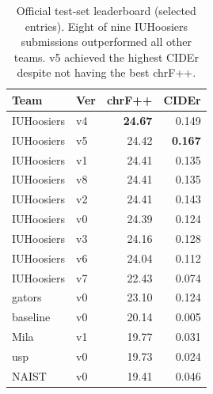 \documentclass[11pt]{article}
\begin{document}
\begin{table}[t]
\centering
\small
\setlength{\tabcolsep}{4pt}
\begin{tabular}{llrr}
\toprule
\textbf{Team} & \textbf{Ver} & \textbf{chrF++} & \textbf{CIDEr} \\
\midrule
IUHoosiers & v4 & \textbf{24.67} & 0.149 \\
IUHoosiers & v5 & 24.42 & \textbf{0.167} \\
IUHoosiers & v1 & 24.41 & 0.135 \\
IUHoosiers & v8 & 24.41 & 0.135 \\
IUHoosiers & v2 & 24.41 & 0.143 \\
IUHoosiers & v0 & 24.39 & 0.124 \\
IUHoosiers & v3 & 24.16 & 0.128 \\
IUHoosiers & v6 & 24.04 & 0.112 \\
IUHoosiers & v7 & 22.43 & 0.074 \\
\midrule
gators      & v0 & 23.10 & 0.124 \\
baseline    & v0 & 20.14 & 0.005 \\
Mila        & v1 & 19.77 & 0.031 \\
usp         & v0 & 19.73 & 0.024 \\
NAIST       & v0 & 19.41 & 0.046 \\
\bottomrule
\end{tabular}
\caption{Official test-set leaderboard (selected entries).
  Eight of nine IUHoosiers submissions outperformed all other teams.
  v5 achieved the highest CIDEr despite not having the best chrF++.}
\label{tab:results}
\end{table}

\end{document}
